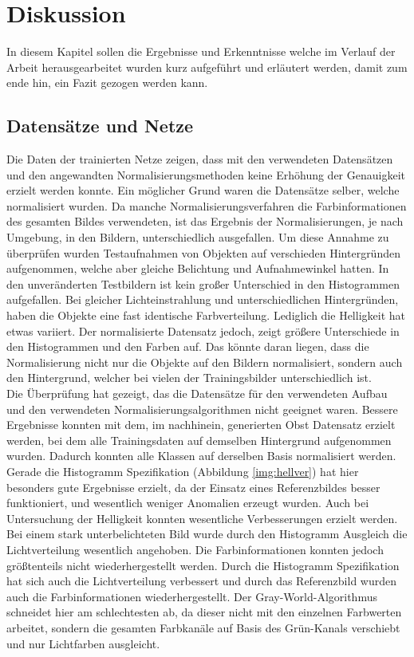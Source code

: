 \chapter{Diskussion}\label{s.diskussion}
In diesem Kapitel sollen die Ergebnisse und Erkenntnisse welche im Verlauf der Arbeit herausgearbeitet wurden kurz aufgeführt und erläutert werden, damit zum ende hin, ein Fazit gezogen werden kann.
\section{Datensätze und Netze}
Die Daten der trainierten Netze zeigen, dass mit den verwendeten Datensätzen und den angewandten Normalisierungsmethoden keine Erhöhung der Genauigkeit erzielt werden konnte. Ein möglicher Grund waren die Datensätze selber, welche normalisiert wurden. Da manche Normalisierungsverfahren die Farbinformationen des gesamten Bildes verwendeten, ist das Ergebnis der Normalisierungen, je nach Umgebung, in den Bildern, unterschiedlich ausgefallen. Um diese Annahme zu überprüfen wurden Testaufnahmen von Objekten auf verschieden Hintergründen aufgenommen, welche aber gleiche Belichtung und Aufnahmewinkel hatten. In den unveränderten Testbildern ist kein großer Unterschied in den Histogrammen aufgefallen. Bei gleicher Lichteinstrahlung und unterschiedlichen Hintergründen, haben die Objekte eine fast identische Farbverteilung. Lediglich die Helligkeit hat etwas variiert. Der normalisierte Datensatz jedoch, zeigt größere Unterschiede in den Histogrammen und den Farben auf. Das könnte daran liegen, dass die Normalisierung nicht nur die Objekte auf den Bildern normalisiert, sondern auch den Hintergrund, welcher bei vielen der Trainingsbilder unterschiedlich ist.\\ 
Die Überprüfung hat gezeigt, das die Datensätze für den verwendeten Aufbau und den verwendeten Normalisierungsalgorithmen nicht geeignet waren. Bessere Ergebnisse konnten mit dem, im nachhinein, generierten Obst Datensatz erzielt werden, bei dem alle Trainingsdaten auf demselben Hintergrund aufgenommen wurden. Dadurch konnten alle Klassen auf derselben Basis normalisiert werden. Gerade die Histogramm Spezifikation (Abbildung \ref{img:hellver}) hat hier besonders gute Ergebnisse erzielt, da der Einsatz eines Referenzbildes besser funktioniert, und wesentlich weniger Anomalien erzeugt wurden. Auch bei Untersuchung der Helligkeit konnten wesentliche Verbesserungen erzielt werden. Bei einem stark unterbelichteten Bild wurde durch den Histogramm Ausgleich die Lichtverteilung wesentlich angehoben. Die Farbinformationen konnten jedoch größtenteils nicht wiederhergestellt werden. Durch die Histogramm Spezifikation hat sich auch die Lichtverteilung verbessert und durch das Referenzbild wurden auch die Farbinformationen wiederhergestellt. Der Gray-World-Algorithmus schneidet hier am schlechtesten ab, da dieser nicht mit den einzelnen Farbwerten arbeitet, sondern die gesamten Farbkanäle auf Basis des Grün-Kanals verschiebt und nur Lichtfarben ausgleicht. 
